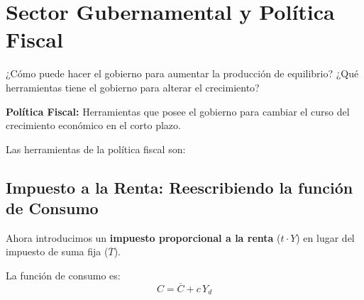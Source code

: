 \documentclass[11pt,a4paper]{article}
\newcommand{\barvar}[1]{\overline{#1}}
\begin{document}
\section{Sector Gubernamental y Política Fiscal}

\begin{definicionbox}
¿Cómo puede hacer el gobierno para aumentar la producción de equilibrio? ¿Qué herramientas tiene el gobierno para alterar el crecimiento?
\end{definicionbox}

\textbf{Política Fiscal:} Herramientas que posee el gobierno para cambiar el curso del crecimiento económico en el corto plazo.

Las herramientas de la política fiscal son:

\begin{center}
\end{center}

\subsection{Impuesto a la Renta: Reescribiendo la función de Consumo}

Ahora introducimos un \textbf{impuesto proporcional a la renta} ($t \cdot Y$) en lugar del impuesto de suma fija ($\barvar{T}$).

La función de consumo es:
\[
C = \barvar{C} + c \, Y_d
\]
\end{document}
